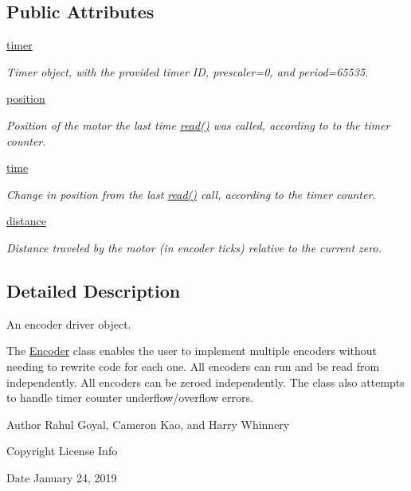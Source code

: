 \subsection*{Public Attributes}
\begin{DoxyCompactItemize}
\item 
\mbox{\hyperlink{classencoder_1_1Encoder_a8e9c3e1317abc4f6fbe95468c69223d1}{timer}}
\begin{DoxyCompactList}\small\item\em Timer object, with the provided timer ID, prescaler=0, and period=65535. \end{DoxyCompactList}\item 
\mbox{\hyperlink{classencoder_1_1Encoder_a9c15eb087b5869c188cf94e53ea3b4f5}{position}}
\begin{DoxyCompactList}\small\item\em Position of the motor the last time \mbox{\hyperlink{classencoder_1_1Encoder_aa1c1535160682500f5214f45d8197027}{read()}} was called, according to to the timer counter. \end{DoxyCompactList}\item 
\mbox{\hyperlink{classencoder_1_1Encoder_a2057baa7c3e6631e2fb30680486a2403}{time}}
\begin{DoxyCompactList}\small\item\em Change in position from the last \mbox{\hyperlink{classencoder_1_1Encoder_aa1c1535160682500f5214f45d8197027}{read()}} call, according to the timer counter. \end{DoxyCompactList}\item 
\mbox{\hyperlink{classencoder_1_1Encoder_ac16be7b70ef28d19b75108d422f82e28}{distance}}
\begin{DoxyCompactList}\small\item\em Distance traveled by the motor (in encoder ticks) relative to the current zero. \end{DoxyCompactList}\end{DoxyCompactItemize}


\subsection{Detailed Description}
An encoder driver object. 

The \mbox{\hyperlink{classencoder_1_1Encoder}{Encoder}} class enables the user to implement multiple encoders without needing to rewrite code for each one. All encoders can run and be read from independently. All encoders can be zeroed independently. The class also attempts to handle timer counter underflow/overflow errors. \begin{DoxyAuthor}{Author}
Rahul Goyal, Cameron Kao, and Harry Whinnery 
\end{DoxyAuthor}
\begin{DoxyCopyright}{Copyright}
License Info 
\end{DoxyCopyright}
\begin{DoxyDate}{Date}
January 24, 2019 
\end{DoxyDate}


